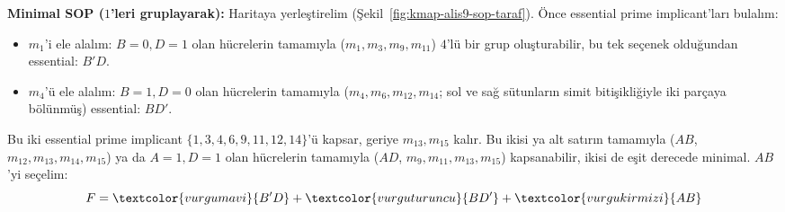 \textbf{Minimal SOP ($1$'leri gruplayarak):} Haritaya yerleştirelim
(Şekil~\ref{fig:kmap-alis9-sop-taraf}). Önce essential prime implicant'ları bulalım:
\begin{itemize}[nosep, leftmargin=*]
    \item $m_1$'i ele alalım: $B=0,D=1$ olan hücrelerin tamamıyla
    ($m_1,m_3,m_9,m_{11}$) $4$'lü bir grup oluşturabilir, bu tek seçenek
    olduğundan essential: $B'D$.
    \item $m_4$'ü ele alalım: $B=1,D=0$ olan hücrelerin tamamıyla
    ($m_4,m_6,m_{12},m_{14}$; sol ve sağ sütunların simit bitişikliğiyle iki
    parçaya bölünmüş) essential: $BD'$.
\end{itemize}
Bu iki essential prime implicant $\{1,3,4,6,9,11,12,14\}$'ü kapsar, geriye
$m_{13},m_{15}$ kalır. Bu ikisi ya alt satırın tamamıyla ($AB$,
$m_{12},m_{13},m_{14},m_{15}$) ya da $A=1,D=1$ olan hücrelerin tamamıyla ($AD$,
$m_9,m_{11},m_{13},m_{15}$) kapsanabilir, ikisi de eşit derecede minimal. $AB$'yi
seçelim:
\[
F = \textcolor{vurgumavi}{B'D} + \textcolor{vurguturuncu}{BD'} + \textcolor{vurgukirmizi}{AB}
\]

